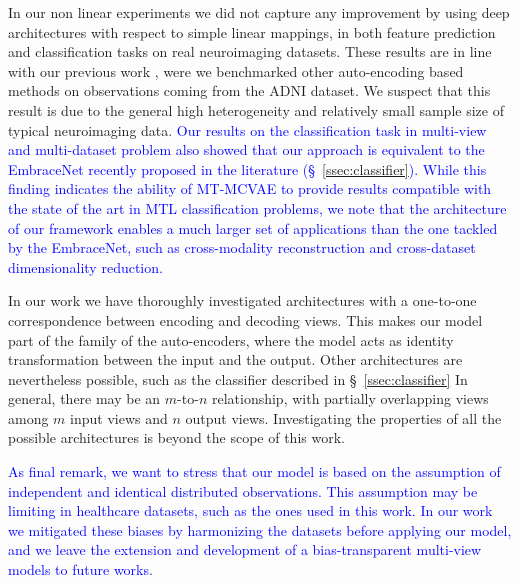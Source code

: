 In our non linear experiments we did not capture any improvement by using deep architectures with respect to simple linear mappings,
in both feature prediction  and classification tasks  on real neuroimaging datasets.
These results are in line with our previous work \citep{Antelmi2019}, were we benchmarked other auto-encoding based methods on observations coming from the ADNI dataset.
We suspect that this result is due to the general high heterogeneity and relatively small sample size of typical neuroimaging data.
\textcolor{blue}{
	Our results on the classification task in multi-view and multi-dataset problem also showed that our approach is equivalent to the EmbraceNet \citep{embracenet} recently proposed in the literature (\S~\ref{ssec:classifier}).
	While this finding indicates the ability of MT-MCVAE to provide results compatible with the state of the art in MTL classification problems,
	we note that the architecture of our framework enables a much larger set of applications than the one tackled by the EmbraceNet,
	such as cross-modality reconstruction and cross-dataset dimensionality reduction.
}

In our work we have thoroughly investigated architectures with a one-to-one correspondence between encoding and decoding views.
This makes our model part of the family of the auto-encoders, where the model acts as identity transformation between the input and the output.
Other architectures are nevertheless possible, such as the classifier described in \S~\ref{ssec:classifier}
In general, there may be an $m$-to-$n$ relationship, with partially overlapping views among $m$ input views and $n$ output views.
Investigating the properties of all the possible architectures is beyond the scope of this work.

\textcolor{blue}{
	As final remark, we want to stress that our model is based on the assumption of independent and identical distributed observations.
	This assumption may be limiting in healthcare datasets, such as the ones used in this work.
	In our work we mitigated these biases by harmonizing the datasets before applying our model, and we leave the extension and development of a bias-transparent multi-view models to future works.
}
